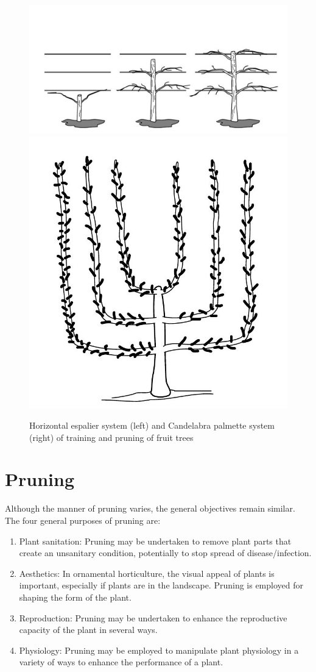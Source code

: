\documentclass[
]{article}
\providecommand{\tightlist}{%
  \setlength{\itemsep}{0pt}\setlength{\parskip}{0pt}}
\begin{document}
\begin{figure}

{\centering \includegraphics[width=.48\linewidth]{./../images/fruits/horizontal_espalier} \includegraphics[width=.48\linewidth]{./../images/fruits/candelabra_palmette} 

}

\caption{Horizontal espalier system (left) and Candelabra palmette system (right) of training and pruning of fruit trees}\label{fig:training-systems2}
\end{figure}

\hypertarget{pruning}{%
\section*{Pruning}\label{pruning}}

Although the manner of pruning varies, the general objectives remain similar. The four general purposes of pruning are:

\begin{enumerate}
\def\labelenumi{\arabic{enumi}.}
\tightlist
\item
  Plant sanitation: Pruning may be undertaken to remove plant parts that create an unsanitary condition, potentially to stop spread of disease/infection.
\item
  Aesthetics: In ornamental horticulture, the visual appeal of plants is important, especially if plants are in the landscape. Pruning is employed for shaping the form of the plant.
\item
  Reproduction: Pruning may be undertaken to enhance the reproductive capacity of the plant in several ways.
\item
  Physiology: Pruning may be employed to manipulate plant physiology in a variety of ways to enhance the performance of a plant.
\end{enumerate}
\end{document}

